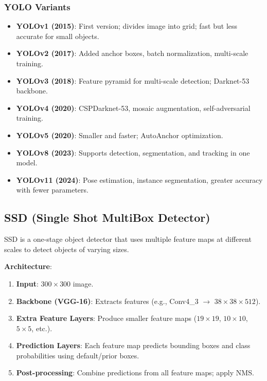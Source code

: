 \documentclass[11pt,a4paper]{article}
\begin{document}
\subsubsection{YOLO Variants}

\begin{itemize}
    \item \textbf{YOLOv1 (2015)}: First version; divides image into grid; fast but less accurate for small objects.
    \item \textbf{YOLOv2 (2017)}: Added anchor boxes, batch normalization, multi-scale training.
    \item \textbf{YOLOv3 (2018)}: Feature pyramid for multi-scale detection; Darknet-53 backbone.
    \item \textbf{YOLOv4 (2020)}: CSPDarknet-53, mosaic augmentation, self-adversarial training.
    \item \textbf{YOLOv5 (2020)}: Smaller and faster; AutoAnchor optimization.
    \item \textbf{YOLOv8 (2023)}: Supports detection, segmentation, and tracking in one model.
    \item \textbf{YOLOv11 (2024)}: Pose estimation, instance segmentation, greater accuracy with fewer parameters.
\end{itemize}


\subsection{SSD (Single Shot MultiBox Detector)}

SSD is a one-stage object detector that uses multiple feature maps at different scales to detect objects of varying sizes.

\textbf{Architecture}:
\begin{enumerate}
    \item \textbf{Input}: $300 \times 300$ image.
    \item \textbf{Backbone (VGG-16)}: Extracts features (e.g., Conv4\_3 $\to$ $38 \times 38 \times 512$).
    \item \textbf{Extra Feature Layers}: Produce smaller feature maps ($19 \times 19$, $10 \times 10$, $5 \times 5$, etc.).
    \item \textbf{Prediction Layers}: Each feature map predicts bounding boxes and class probabilities using default/prior boxes.
    \item \textbf{Post-processing}: Combine predictions from all feature maps; apply NMS.
\end{enumerate}
\end{document}
